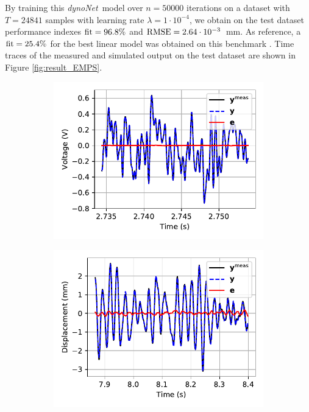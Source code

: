 \documentclass{article}
\newcommand{\nsamp}{T}
\newcommand{\Name}{\emph{dynoNet}}
\begin{document}
By training this \Name\ model over $n\!=\!50000$ iterations on a dataset with $\nsamp=24841$ samples with learning rate $\lambda\!=\!1\cdot10^{-4}$, we obtain on the test dataset performance indexes $\rm fit=96.8\%$ and $\rm {RMSE} = 2.64\cdot 10^{-3}$~mm. As reference, a $\rm fit=25.4\%$ for the best linear model was obtained on this benchmark \cite{janot2019data}. Time traces of the measured and simulated output on the test dataset are shown in Figure \ref{fig:result_EMPS}.

\begin{figure}[h]
	\centering
	\begin{subfigure}{.33\textwidth}
		\centering
		\includegraphics[width=\linewidth]{fig/WH_timetrace.pdf}
		\label{fig:result_WH}
	\end{subfigure}%
	\begin{subfigure}{.33\textwidth}
		\centering
		\includegraphics[width=\linewidth]{fig/BW_timetrace.pdf}

\end{subfigure}
\end{figure}
\end{document}
